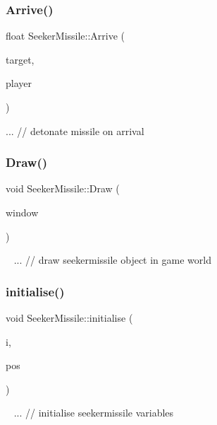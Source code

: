 \subsubsection{\texorpdfstring{Arrive()}{Arrive()}}
{\footnotesize\ttfamily float Seeker\+Missile\+::\+Arrive (\begin{DoxyParamCaption}\item[{sf\+::\+Vector2f}]{target,  }\item[{\mbox{\hyperlink{class_player}{Player}} $\ast$}]{player }\end{DoxyParamCaption})}

... // detonate missile on arrival\mbox{\label{class_seeker_missile_a8744918a81a590920c2555ac68dac04c}} 
\subsubsection{\texorpdfstring{Draw()}{Draw()}}
{\footnotesize\ttfamily void Seeker\+Missile\+::\+Draw (\begin{DoxyParamCaption}\item[{sf\+::\+Render\+Window \&}]{window }\end{DoxyParamCaption})}

~\newline
... // draw seekermissile object in game world\mbox{\label{class_seeker_missile_a09c20c51520a2ee6c3282d7284ec1528}} 
\subsubsection{\texorpdfstring{initialise()}{initialise()}}
{\footnotesize\ttfamily void Seeker\+Missile\+::initialise (\begin{DoxyParamCaption}\item[{int}]{i,  }\item[{sf\+::\+Vector2f}]{pos }\end{DoxyParamCaption})}

~\newline
... // initialise seekermissile variables\mbox{\label{class_seeker_missile_a1fe0f447573c340c2a11c0313ebf9ea2}} 
